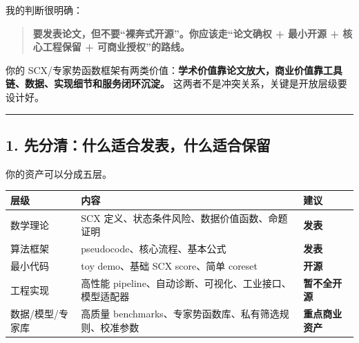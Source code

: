 \documentclass[
  12pt,
]{ctexart}
\author{SCX}
\date{2026}
\begin{document}
我的判断很明确：

\begin{quote}
\textbf{要发表论文，但不要``裸奔式开源''。你应该走``论文确权 + 最小开源
+ 核心工程保留 + 可商业授权''的路线。}
\end{quote}

你的
SCX/专家势函数框架有两类价值：\textbf{学术价值靠论文放大，商业价值靠工具链、数据、实现细节和服务闭环沉淀。}
这两者不是冲突关系，关键是开放层级要设计好。

\begin{center}\rule{0.5\linewidth}{0.5pt}\end{center}

\subsection{1.
先分清：什么适合发表，什么适合保留}\label{ux5148ux5206ux6e05ux4ec0ux4e48ux9002ux5408ux53d1ux8868ux4ec0ux4e48ux9002ux5408ux4fddux7559}

你的资产可以分成五层。

\begin{longtable}[]{@{}
  >{\raggedright\arraybackslash}p{}
  >{\raggedright\arraybackslash}p{}
  >{\raggedright\arraybackslash}p{}@{}}
\toprule\noalign{}
\begin{minipage}[b]{\linewidth}\raggedright
层级
\end{minipage} & \begin{minipage}[b]{\linewidth}\raggedright
内容
\end{minipage} & \begin{minipage}[b]{\linewidth}\raggedright
建议
\end{minipage} \\
\midrule\noalign{}
\endhead
\bottomrule\noalign{}
\endlastfoot
数学理论 & SCX 定义、状态条件风险、数据价值函数、命题证明 &
\textbf{发表} \\
算法框架 & pseudocode、核心流程、基本公式 & \textbf{发表} \\
最小代码 & toy demo、基础 SCX score、简单 coreset & \textbf{开源} \\
工程实现 & 高性能 pipeline、自动诊断、可视化、工业接口、模型适配器 &
\textbf{暂不全开源} \\
数据/模型/专家库 & 高质量
benchmarks、专家势函数库、私有筛选规则、校准参数 &
\textbf{重点商业资产} \\
\end{longtable}
\end{document}
